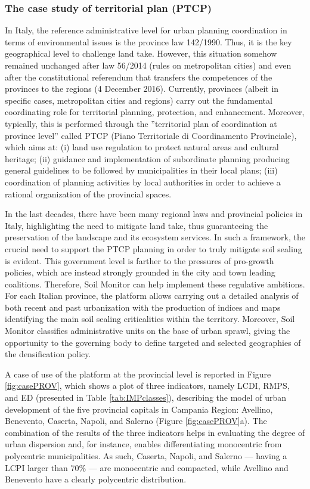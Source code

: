 \documentclass[APA,LATO1COL,doublespace]{WileyNJD-v2}
\begin{document}
\subsubsection{The case study of territorial plan (PTCP)}
In Italy, the reference administrative level for urban planning coordination in terms of environmental issues is the province law 142/1990. 
Thus, it is the key geographical level to challenge land take. 
However, this situation somehow remained unchanged after law 56/2014 (rules on metropolitan cities) and even after the constitutional referendum that transfers the competences of the provinces to the regions (4 December 2016).
Currently, provinces (albeit in specific cases, metropolitan cities and regions) carry out the fundamental coordinating role for territorial planning, protection, and enhancement. 
Moreover, typically, this is performed through the ''territorial plan of coordination at province level'' called PTCP (Piano Territoriale di Coordinamento Provinciale), which aims at: (i) land use regulation to protect natural areas and cultural heritage; (ii) guidance and implementation of subordinate planning producing general guidelines to be followed by municipalities in their local plans; (iii) coordination of planning activities by local authorities in order to achieve a rational organization of the provincial spaces.

In the last decades, there have been many regional laws and provincial policies in Italy, highlighting the need to mitigate land take, thus guaranteeing the preservation of the landscape and its ecosystem services. 
In such a framework, the crucial need to support the PTCP planning in order to truly mitigate soil sealing is evident. 
This government level is farther to the pressures of pro-growth policies, which are instead strongly grounded in the city and town leading coalitions.
Therefore, Soil Monitor can help implement these regulative ambitions.
For each Italian province, the platform allows carrying out a detailed analysis of both recent and past urbanization with the production of indices and maps identifying the main soil sealing criticalities within the territory.
Moreover, Soil Monitor classifies administrative units on the base of urban sprawl, giving the opportunity to the governing body to define targeted and selected geographies of the densification policy.

A case of use of the platform at the provincial level is reported in Figure \ref{fig:casePROV}, which shows a plot of three indicators, namely LCDI, RMPS, and ED (presented in Table \ref{tab:IMPclasses}), describing the model of urban development of the five provincial capitals in Campania Region: Avellino, Benevento, Caserta, Napoli, and Salerno (Figure \ref{fig:casePROV}a). 
The combination of the results of the three indicators helps in evaluating the degree of urban dispersion and, for instance, enables differentiating monocentric from polycentric municipalities. 
As such, Caserta, Napoli, and Salerno --- having a LCPI larger than 70\% --- are monocentric and compacted, while Avellino and Benevento have a clearly polycentric distribution.
\end{document}
